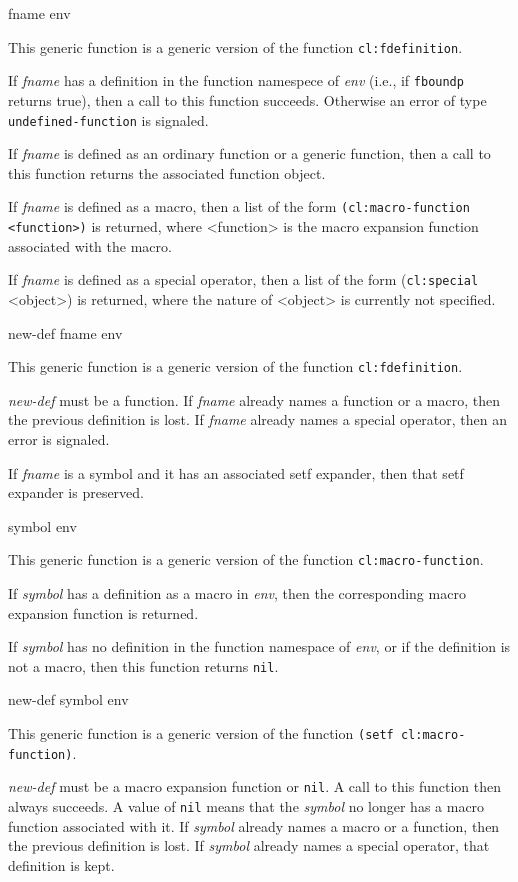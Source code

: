  {fname env}

This generic function is a generic version of the \commonlisp{}
function \texttt{cl:fdefinition}. 

If \textit{fname} has a definition in the function namespece of
\textit{env} (i.e., if \texttt{fboundp} returns true), then a call to
this function succeeds.  Otherwise an error of type
\texttt{undefined-function} is signaled.

If \textit{fname} is defined as an ordinary function or a generic
function, then a call to this function returns the associated
function object.

If \textit{fname} is defined as a macro, then a list of the form
\texttt{(cl:macro-function <function>)} is returned, where <function>
is the macro expansion function associated with the macro.

If \textit{fname} is defined as a special operator, then a list of the
form (\texttt{cl:special} <object>) is returned, where the nature of
<object> is currently not specified.

 {new-def fname env}

This generic function is a generic version of the \commonlisp{}
function \texttt{cl:fdefinition}. 

\textit{new-def} must be a function.  If \textit{fname} already names
a function or a macro, then the previous definition is lost.  If
\textit{fname} already names a special operator, then an error is
signaled.

If \textit{fname} is a symbol and it has an associated setf
expander, then that setf expander is preserved.

 {symbol env}

This generic function is a generic version of the \commonlisp{}
function \texttt{cl:macro-function}.

If \textit{symbol} has a definition as a macro in \textit{env}, then the
corresponding macro expansion function is returned.

If \textit{symbol} has no definition in the function namespace of
\textit{env}, or if the definition is not a macro, then this
function returns \texttt{nil}.


 {new-def symbol env}

This generic function is a generic version of the \commonlisp{}
function \texttt{(setf cl:macro-function)}.

\textit{new-def} must be a macro expansion function or \texttt{nil}.
A call to this function then always succeeds.  A value of \texttt{nil}
means that the \textit{symbol} no longer has a macro function
associated with it.  If \textit{symbol} already names a macro or a
function, then the previous definition is lost.  If \textit{symbol}
already names a special operator, that definition is kept.

